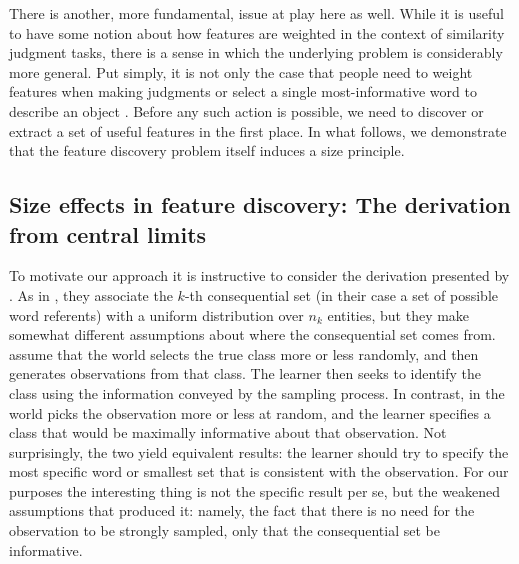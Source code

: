 \documentclass{apa}
\begin{document}
There is another, more fundamental, issue at play here as well. While it is useful to have some notion about how features are weighted in the context of similarity judgment tasks, there is a sense in which the underlying problem is considerably more general. Put simply, it is not only the case that people need to weight features when making judgments \cite<as per>{Tenenbaum2001} or select a single most-informative word to describe an object \cite<as per>{Frank2009}. Before any such action is possible, we need to discover or extract a set of useful features in the first place. In what follows, we demonstrate that the feature discovery problem itself induces a size principle.

\subsection{Size effects in feature discovery: The derivation from central limits}

To motivate our approach it is instructive to consider the derivation presented by . As in , they associate the $k$-th consequential set (in their case a set of possible word referents) with a uniform distribution over $n_k$ entities, but they make somewhat different assumptions about where the consequential set comes from.   assume that the world selects the true class more or less randomly, and then generates observations from that class. The learner then seeks to identify the class using the information conveyed by the sampling process. In contrast, in  the world picks the observation more or less at random, and the learner specifies a class that would be maximally informative about that observation. Not surprisingly, the two yield equivalent results: the learner should try to specify the most specific word or smallest set that is consistent with the observation. For our purposes the interesting thing is not the specific result per se, but the weakened assumptions that produced it: namely, the fact that there is no need for the observation to be strongly sampled, only that the consequential set be informative.
\end{document}
